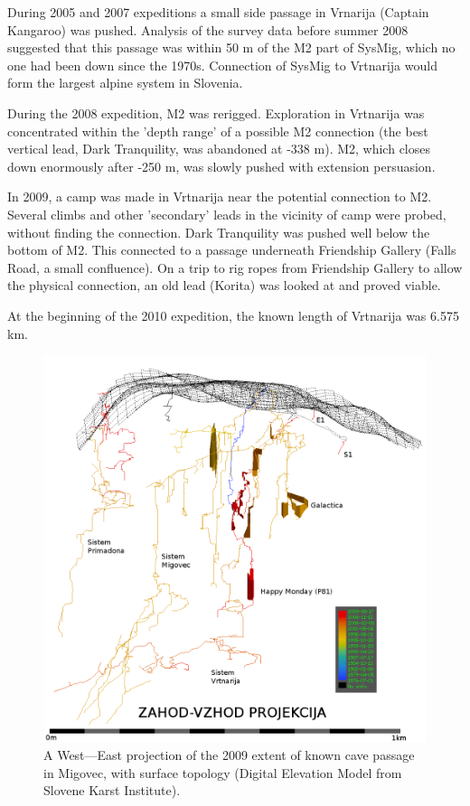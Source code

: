 During 2005 and 2007 expeditions a small side passage in Vrnarija
(Captain Kangaroo) was pushed. Analysis of the survey data before
summer 2008 suggested that this passage was within 50 m of the M2
part of SysMig, which no one had been down since the 1970s. Connection
of SysMig to Vrtnarija would form the largest alpine system in Slovenia.

During the 2008 expedition, M2 was rerigged. Exploration in Vrtnarija
was concentrated within the 'depth range' of a possible M2 connection
(the best vertical lead, Dark Tranquility, was abandoned at -338 m).
M2, which closes down enormously after -250 m, was slowly pushed with
extension persuasion. 

In 2009, a camp was made in Vrtnarija near the potential connection
to M2. Several climbs and other 'secondary' leads in the vicinity
of camp were probed, without finding the connection. Dark Tranquility
was pushed well below the bottom of M2. This connected to a passage underneath
Friendship Gallery (Falls Road, a small confluence). 
On a trip to rig ropes from Friendship Gallery to allow the physical
connection, an old lead (Korita) was looked at and proved viable.

At the beginning of the 2010 expedition, the known length of Vrtnarija
was 6.575 km.

\begin{center}
\begin{figure}
\centering
\includegraphics[width=0.75\columnwidth]{2010/interim_report/mig_2009_for_jamar.png}
\caption{A West---East projection of the 2009 extent of known cave passage in Migovec, with surface topology
(Digital Elevation Model from Slovene Karst Institute).}
\end{figure}
\end{center}


